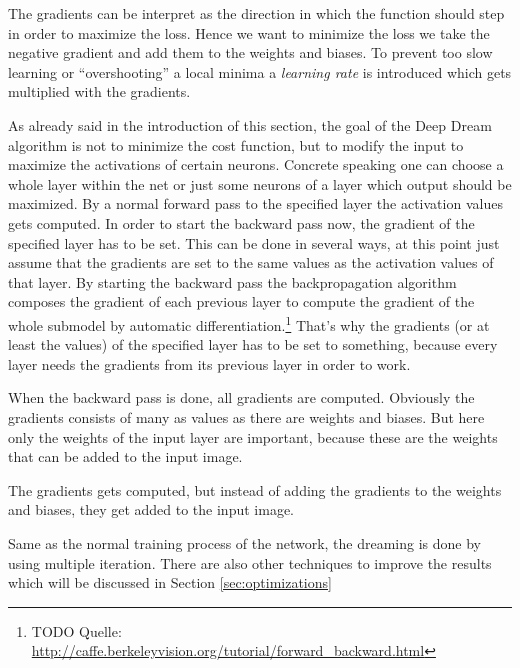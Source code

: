 The gradients can be interpret as the direction in which the function should step in order to maximize the loss.
Hence we want to minimize the loss we take the negative gradient and add them to the weights and biases.
To prevent too slow learning or \enquote{overshooting} a local minima a \emph{learning rate} is introduced which gets multiplied with the gradients.

As already said in the introduction of this section, the goal of the Deep Dream algorithm is not to minimize the cost function, but to modify the input to maximize the activations of certain neurons.
Concrete speaking one can choose a whole layer within the net or just some neurons of a layer which output should be maximized.
By a normal forward pass to the specified layer the activation values gets computed.
In order to start the backward pass now, the gradient of the specified layer has to be set.
This can be done in several ways, at this point just assume that the gradients are set to the same values as the
activation values of that layer.
By starting the backward pass the backpropagation algorithm composes the gradient of each previous layer to compute the gradient of the whole submodel by automatic differentiation.\footnote{TODO Quelle: \url{http://caffe.berkeleyvision.org/tutorial/forward_backward.html}}
That's why the gradients (or at least the values) of the specified layer has to be set to something, because every layer needs the gradients from its previous layer in order to work.

When the backward pass is done, all gradients are computed.
Obviously the gradients consists of many as values as there are weights and biases.
But here only the weights of the input layer are important, because these are the weights that can be added to the input image.


The gradients gets computed, but instead of adding the gradients to the weights and biases, they get added to the input image.



Same as the normal training process of the network, the dreaming is done by using multiple iteration.
There are also other techniques to improve the results which will be discussed in Section \ref{sec:optimizations}



